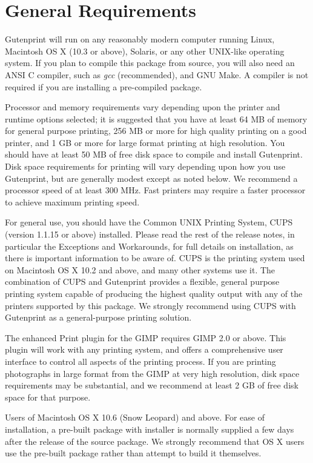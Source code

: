 \documentclass{article}[letter]
\begin{document}
\section{General Requirements}

Gutenprint will run on any reasonably modern computer running Linux,
Macintosh OS X (10.3 or above), Solaris, or any other UNIX-like
operating system. If you plan to compile this package from source, you
will also need an ANSI C compiler, such as {\em gcc} (recommended), and
GNU Make. A compiler is not required if you are installing a
pre-compiled package.

Processor and memory requirements vary depending upon the printer and
runtime options selected; it is suggested that you have at least 64 MB
of memory for general purpose printing, 256 MB or more for high
quality printing on a good printer, and 1 GB or more for large format
printing at high resolution. You should have at least 50 MB of free
disk space to compile and install Gutenprint. Disk space requirements
for printing will vary depending upon how you use Gutenprint, but are
generally modest except as noted below. We recommend a processor speed
of at least 300 MHz. Fast printers may require a faster processor to
achieve maximum printing speed.

For general use, you should have the Common UNIX Printing System, CUPS
(version 1.1.15 or above) installed. Please read the rest of the
release notes, in particular the Exceptions and Workarounds, for full
details on installation, as there is important information to be aware
of. CUPS is the printing system used on Macintosh OS X 10.2 and above,
and many other systems use it. The combination of CUPS and Gutenprint
provides a flexible, general purpose printing system capable of
producing the highest quality output with any of the printers
supported by this package. We strongly recommend using CUPS with
Gutenprint as a general-purpose printing solution.

The enhanced Print plugin for the GIMP requires GIMP 2.0 or
above. This plugin will work with any printing system, and offers a
comprehensive user interface to control all aspects of the printing
process. If you are printing photographs in large format from the GIMP
at very high resolution, disk space requirements may be substantial,
and we recommend at least 2 GB of free disk space for that purpose.

Users of Macintosh OS X 10.6 (Snow Leopard) and above. For ease of
installation, a pre-built package with installer is normally supplied
a few days after the release of the source package. We strongly
recommend that OS X users use the pre-built package rather than
attempt to build it themselves.
\end{document}
